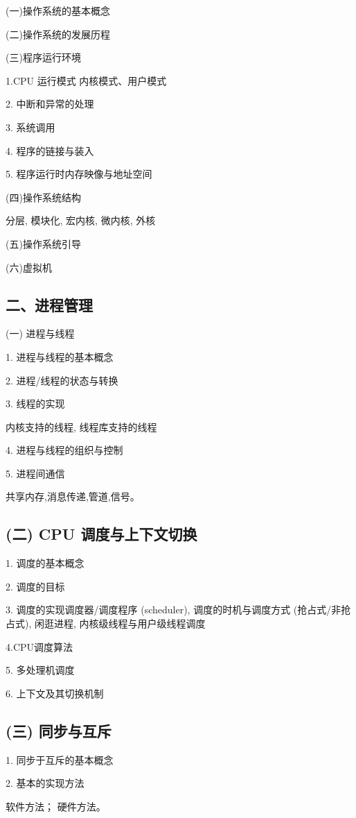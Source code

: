 \documentclass[10pt]{article}
\begin{document}
(一)操作系统的基本概念

(二)操作系统的发展历程

(三)程序运行环境

1.CPU 运行模式 内核模式、用户模式

2. 中断和异常的处理

3. 系统调用

4. 程序的链接与装入

5. 程序运行时内存映像与地址空间

{\color{red} (四)操作系统结构

分层, 模块化, 宏内核, 微内核, 外核}

{\color{red} (五)操作系统引导}

{\color{red}(六)虚拟机}
\subsection*{二、进程管理}

(一) 进程与线程

1. 进程与线程的基本概念

2. 进程/线程的状态与转换

3. 线程的实现

内核支持的线程, 线程库支持的线程

4. 进程与线程的组织与控制

5. 进程间通信

共享内存,消息传递,管道,信号。

\subsection*{(二) CPU 调度与上下文切换}

1. 调度的基本概念 

2. 调度的目标 

3. 调度的实现调度器/调度程序 (scheduler), 调度的时机与调度方式 (抢占式/非抢占式), 闲逛进程, 内核级线程与用户级线程调度 

4.CPU调度算法

5. 多处理机调度

6. 上下文及其切换机制

\subsection*{(三) 同步与互斥}

1. 同步于互斥的基本概念

2. 基本的实现方法

软件方法；{\color{red} 硬件方法}。
\end{document}
